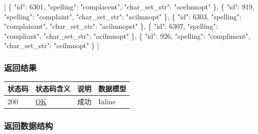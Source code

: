 \documentclass[
]{article}
\newenvironment{Shaded}{}{}
\newcommand{\DataTypeTok}[1]{\textcolor[rgb]{0.56,0.13,0.00}{#1}}
\newcommand{\DecValTok}[1]{\textcolor[rgb]{0.25,0.63,0.44}{#1}}
\newcommand{\FunctionTok}[1]{\textcolor[rgb]{0.02,0.16,0.49}{#1}}
\newcommand{\OtherTok}[1]{\textcolor[rgb]{0.00,0.44,0.13}{#1}}
\newcommand{\StringTok}[1]{\textcolor[rgb]{0.25,0.44,0.63}{#1}}
\begin{document}
\begin{Shaded}
\begin{Highlighting}[]
\OtherTok{[}
  \FunctionTok{\{}
    \DataTypeTok{"id"}\FunctionTok{:} \DecValTok{6301}\FunctionTok{,}
    \DataTypeTok{"spelling"}\FunctionTok{:} \StringTok{"complacent"}\FunctionTok{,}
    \DataTypeTok{"char\_set\_str"}\FunctionTok{:} \StringTok{"acelmnopt"}
  \FunctionTok{\}}\OtherTok{,}
  \FunctionTok{\{}
    \DataTypeTok{"id"}\FunctionTok{:} \DecValTok{919}\FunctionTok{,}
    \DataTypeTok{"spelling"}\FunctionTok{:} \StringTok{"complaint"}\FunctionTok{,}
    \DataTypeTok{"char\_set\_str"}\FunctionTok{:} \StringTok{"acilmnopt"}
  \FunctionTok{\}}\OtherTok{,}
  \FunctionTok{\{}
    \DataTypeTok{"id"}\FunctionTok{:} \DecValTok{6303}\FunctionTok{,}
    \DataTypeTok{"spelling"}\FunctionTok{:} \StringTok{"complaisant"}\FunctionTok{,}
    \DataTypeTok{"char\_set\_str"}\FunctionTok{:} \StringTok{"acilmnopst"}
  \FunctionTok{\}}\OtherTok{,}
  \FunctionTok{\{}
    \DataTypeTok{"id"}\FunctionTok{:} \DecValTok{6307}\FunctionTok{,}
    \DataTypeTok{"spelling"}\FunctionTok{:} \StringTok{"compliant"}\FunctionTok{,}
    \DataTypeTok{"char\_set\_str"}\FunctionTok{:} \StringTok{"acilmnopt"}
  \FunctionTok{\}}\OtherTok{,}
  \FunctionTok{\{}
    \DataTypeTok{"id"}\FunctionTok{:} \DecValTok{926}\FunctionTok{,}
    \DataTypeTok{"spelling"}\FunctionTok{:} \StringTok{"compliment"}\FunctionTok{,}
    \DataTypeTok{"char\_set\_str"}\FunctionTok{:} \StringTok{"ceilmnopt"}
  \FunctionTok{\}}
\OtherTok{]}
\end{Highlighting}
\end{Shaded}

\hypertarget{ux8fd4ux56deux7ed3ux679c-5}{%
\subsubsection{返回结果}\label{ux8fd4ux56deux7ed3ux679c-5}}

\begin{longtable}[]{@{}llll@{}}
\toprule
状态码 & 状态码含义 & 说明 & 数据模型 \\
\midrule
\endhead
200 & \href{https://tools.ietf.org/html/rfc7231\#section-6.3.1}{OK} &
成功 & Inline \\
\bottomrule
\end{longtable}

\hypertarget{ux8fd4ux56deux6570ux636eux7ed3ux6784-5}{%
\subsubsection{返回数据结构}\label{ux8fd4ux56deux6570ux636eux7ed3ux6784-5}}
\end{document}
